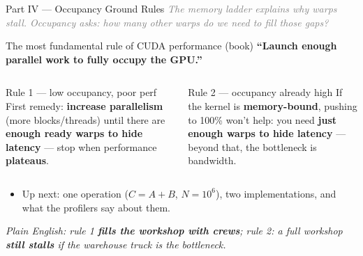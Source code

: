 \documentclass[aspectratio=169]{beamer}
\newcommand{\kw}[1]{\textbf{\textcolor{kwblue}{#1}}}
\newcommand{\pe}[1]{\par{\setlength{\fboxsep}{2.5pt}\noindent\colorbox{navy!9}{\parbox{\dimexpr\textwidth-5pt\relax}{\footnotesize\itshape Plain English: #1}}}}
\newcommand{\bridge}[1]{{\footnotesize\itshape\textcolor{gray}{#1}}\par}
\begin{document}
\begin{frame}{Part IV --- Occupancy Ground Rules}
  \bridge{The memory ladder explains \emph{why} warps stall. Occupancy asks: how many \emph{other} warps do we need to fill those gaps?}
  \begin{block}{The most fundamental rule of CUDA performance (book)}
    \centering \kw{``Launch enough parallel work to fully occupy the GPU.''}
  \end{block}
  \begin{columns}[t]
    \begin{block}{Rule 1 --- low occupancy, poor perf}
      \small First remedy: \kw{increase parallelism} (more blocks/threads) until there are
      \kw{enough ready warps to hide latency} --- stop when performance \kw{plateaus}.
    \end{block}
    \begin{block}{Rule 2 --- occupancy already high}
      \small If the kernel is \kw{memory-bound}, pushing to 100\% won't help: you need
      \kw{just enough warps to hide latency} --- beyond that, the bottleneck is bandwidth.
    \end{block}
  \end{columns}
  \medskip
  \begin{itemize}\small
    \item Up next: one operation ($C = A + B$, $N = 10^6$), two implementations,
          and what the profilers say about them.
  \end{itemize}
  \pe{rule 1 \kw{fills the workshop with crews}; rule 2: a full workshop \kw{still stalls} if the warehouse truck is the bottleneck.}
\end{frame}
\end{document}
